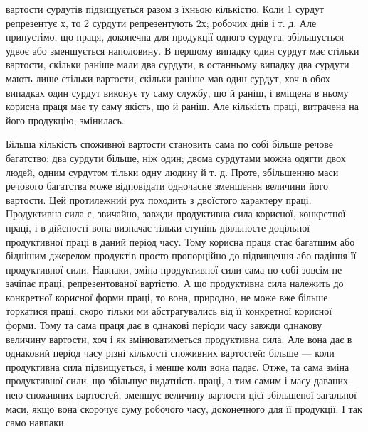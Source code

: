 \parcont{}  %
вартости сурдутів підвищується разом з їхньою кількістю. Коли
1 сурдут репрезентує х, то 2 сурдути репрезентують 2х; робочих
днів і т. д. Але припустімо, що праця, доконечна для продукції
одного сурдута, збільшується удвоє або зменшується наполовину.
В першому випадку один сурдут має стільки вартости, скільки
раніше мали два сурдути, в останньому випадку два сурдути
мають лише стільки вартости, скільки раніше мав один сурдут,
хоч в обох випадках один сурдут виконує ту саму службу, що й
раніш, і вміщена в ньому корисна праця має ту саму якість, що
й раніш. Але кількість праці, витрачена на його продукцію,
змінилась.

Більша кількість споживної вартости становить сама по собі
більше речове багатство: два сурдути більше, ніж один; двома
сурдутами можна одягти двох людей, одним сурдутом тільки одну
людину й т. д. Проте, збільшенню маси речового багатства може
відповідати одночасне зменшення величини його вартости. Цей
протилежний рух походить з двоїстого характеру праці. Продуктивна
сила є, звичайно, завжди продуктивна сила корисної, конкретної
праці, і в дійсності вона визначає тільки ступінь діяльносте
доцільної продуктивної праці в даний період часу. Тому
корисна праця стає багатшим або біднішим джерелом продуктів
просто пропорційно до підвищення або падіння її продуктивної
сили. Навпаки, зміна продуктивної сили сама по собі зовсім не
зачіпає праці, репрезентованої вартістю. А що продуктивна сила належить
до конкретної корисної форми праці, то вона, природно, не
може вже більше торкатися праці, скоро тільки ми абстрагувались
від її конкретної корисної форми. Тому та сама праця дає в однакові
періоди часу завжди однакову величину вартости, хоч і як
змінюватиметься продуктивна сила. Але вона дає в однаковий
період часу різні кількості споживних вартостей: більше — коли
продуктивна сила підвищується, і менше коли вона падає. Отже,
та сама зміна продуктивної сили, що збільшує видатність праці,
а тим самим і масу даваних нею споживних вартостей, зменшує
величину вартости цієї збільшеної загальної маси, якщо вона
скорочує суму робочого часу, доконечного для її продукції. І так
само навпаки.

